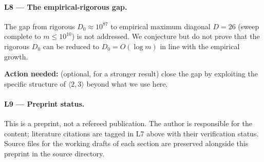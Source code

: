 \documentclass[11pt,a4paper]{article}
\theoremstyle{plain}
\theoremstyle{definition}
\theoremstyle{remark}
\begin{document}
\paragraph{L8 --- The empirical-rigorous gap.}
The gap from rigorous $D_{0} \approx 10^{87}$ to empirical maximum
diagonal $D = 26$ (sweep complete to $m \leq 10^{10}$) is not
addressed. We conjecture but do not prove that the rigorous $D_{0}$
can be reduced to $D_{0} = O(\log m)$ in line with the empirical
growth.

\textbf{Action needed:} (optional, for a stronger result) close the
gap by exploiting the specific structure of $\langle 2, 3 \rangle$
beyond what we use here.

\paragraph{L9 --- Preprint status.}
This is a preprint, not a refereed publication. The author is
responsible for the content; literature citations are tagged in L7
above with their verification status. Source files for the working
drafts of each section are preserved alongside this preprint in the
source directory.

\end{document}
